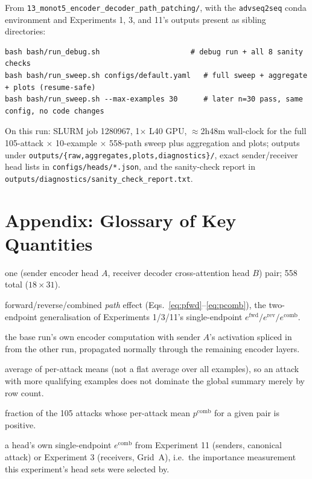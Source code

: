 \documentclass[11pt]{article}
\newcommand{\fwd}{\ensuremath{e^{\mathrm{fwd}}}}
\newcommand{\rev}{\ensuremath{e^{\mathrm{rev}}}}
\newcommand{\comb}{\ensuremath{e^{\mathrm{comb}}}}
\newcommand{\pfwd}{\ensuremath{p^{\mathrm{fwd}}}}
\newcommand{\prev}{\ensuremath{p^{\mathrm{rev}}}}
\newcommand{\pcomb}{\ensuremath{p^{\mathrm{comb}}}}
\begin{document}
From \texttt{13\_monot5\_encoder\_decoder\_path\_patching/}, with the
\texttt{advseq2seq} conda environment and Experiments 1, 3, and 11's outputs
present as sibling directories:

\begin{lstlisting}
bash bash/run_debug.sh                     # debug run + all 8 sanity checks
bash bash/run_sweep.sh configs/default.yaml   # full sweep + aggregate + plots (resume-safe)
bash bash/run_sweep.sh --max-examples 30      # later n=30 pass, same config, no code changes
\end{lstlisting}

\noindent On this run: SLURM job 1280967, 1$\times$ L40 GPU, $\approx$2h48m
wall-clock for the full 105-attack $\times$ 10-example $\times$ 558-path
sweep plus aggregation and plots; outputs under
\texttt{outputs/\{raw,aggregates,plots,diagnostics\}/}, exact sender/receiver
head lists in \texttt{configs/heads/*.json}, and the sanity-check report in
\texttt{outputs/diagnostics/sanity\_check\_report.txt}.

\section*{Appendix: Glossary of Key Quantities}

\begin{description}[leftmargin=1.8em,style=nextline]
  \item[path] one (sender encoder head $A$, receiver decoder cross-attention
  head $B$) pair; 558 total ($18 \times 31$).
  \item[$\pfwd$ / $\prev$ / $\pcomb$] forward/reverse/combined \emph{path}
  effect (Eqs.~\ref{eq:pfwd}--\ref{eq:pcomb}), the two-endpoint generalisation
  of Experiments 1/3/11's single-endpoint $\fwd/\rev/\comb$.
  \item[hybrid encoder representation] the base run's own encoder
  computation with sender $A$'s activation spliced in from the other run,
  propagated normally through the remaining encoder layers.
  \item[attack-balanced aggregation] average of per-attack means (not a flat
  average over all examples), so an attack with more qualifying examples
  does not dominate the global summary merely by row count.
  \item[stability] fraction of the 105 attacks whose per-attack mean
  $\pcomb$ for a given pair is positive.
  \item[standalone effect] a head's own single-endpoint $\comb$ from
  Experiment 11 (senders, canonical attack) or Experiment 3 (receivers,
  Grid~A), i.e.\ the importance measurement this experiment's head sets were
  selected by.
\end{description}
\end{document}
